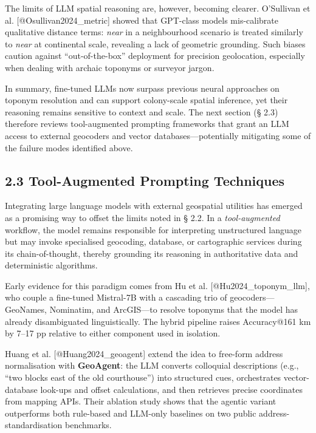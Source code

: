 \documentclass[
  11pt,
]{article}
\begin{document}
The limits of LLM spatial reasoning are, however, becoming clearer.
O'Sullivan et al. {[}@Osullivan2024\_metric{]} showed that GPT-class
models mis-calibrate qualitative distance terms: \emph{near} in a
neighbourhood scenario is treated similarly to \emph{near} at
continental scale, revealing a lack of geometric grounding. Such biases
caution against ``out-of-the-box'' deployment for precision geolocation,
especially when dealing with archaic toponyms or surveyor jargon.

In summary, fine-tuned LLMs now surpass previous neural approaches on
toponym resolution and can support colony-scale spatial inference, yet
their reasoning remains sensitive to context and scale. The next section
(§ 2.3) therefore reviews tool-augmented prompting frameworks that grant
an LLM access to external geocoders and vector databases---potentially
mitigating some of the failure modes identified above.

\subsection{2.3 Tool-Augmented Prompting
Techniques}\label{tool-augmented-prompting-techniques}

Integrating large language models with external geospatial utilities has
emerged as a promising way to offset the limits noted in § 2.2. In a
\emph{tool-augmented} workflow, the model remains responsible for
interpreting unstructured language but may invoke specialised geocoding,
database, or cartographic services during its chain-of-thought, thereby
grounding its reasoning in authoritative data and deterministic
algorithms.

Early evidence for this paradigm comes from Hu et al.
{[}@Hu2024\_toponym\_llm{]}, who couple a fine-tuned Mistral-7B with a
cascading trio of geocoders---GeoNames, Nominatim, and ArcGIS---to
resolve toponyms that the model has already disambiguated
linguistically. The hybrid pipeline raises Accuracy@161 km by 7--17 pp
relative to either component used in isolation.

Huang et al. {[}@Huang2024\_geoagent{]} extend the idea to free-form
address normalisation with \textbf{GeoAgent}: the LLM converts
colloquial descriptions (e.g., ``two blocks east of the old
courthouse'') into structured cues, orchestrates vector-database
look-ups and offset calculations, and then retrieves precise coordinates
from mapping APIs. Their ablation study shows that the agentic variant
outperforms both rule-based and LLM-only baselines on two public
address-standardisation benchmarks.
\end{document}
